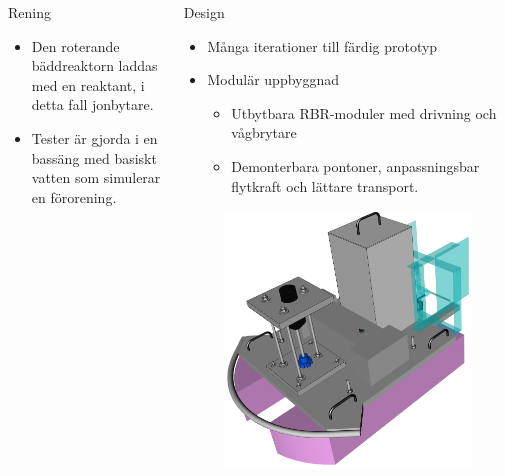 \documentclass[final]{beamer}
\newlength{\onecolwid}
\begin{document}
\begin{frame}[t]
\begin{columns}[t, totalwidth=\textwidth]
\begin{column}{\onecolwid}
      \begin{block}{Rening}
        \begin{itemize}
        \item Den roterande bäddreaktorn laddas med en reaktant, i detta fall jonbytare.
        \item Tester är gjorda i en bassäng med basiskt vatten som simulerar en förorening.
        \end{itemize}

      \end{block}

    \end{column} %

    \begin{column}{\onecolwid} %

      \begin{block}{Design}
        \begin{itemize}
        \item Många iterationer till färdig prototyp

        \item Modulär uppbyggnad
          \begin{itemize}
          \item Utbytbara RBR-moduler med drivning och vågbrytare
          \item Demonterbara pontoner, anpassningsbar flytkraft och lättare transport.
          \end{itemize}
        \end{itemize}

        \begin{figure}[H]
          \centering
          \includegraphics[width=\linewidth]{figures/front_box_off.png}
        \end{figure}


\end{block}
\end{column}
\end{columns}
\end{frame}
\end{document}
